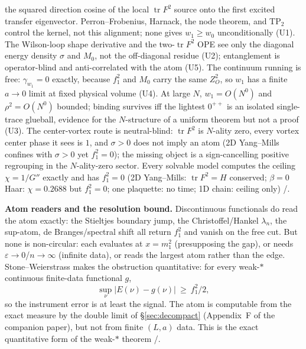 \documentclass[11pt,a4paper]{article}
\newcommand{\labb}[2]{\fcolorbox{#1!35}{#1!8}{\textcolor{#1}{\textbf{\scriptsize #2}}}}
\newcommand{\LT}{\labb{cT}{T}}
\newcommand{\LN}{\labb{cN}{N}}
\newcommand{\LE}{\labb{cE}{E}}
\begin{document}
the squared direction cosine of the local $\operatorname{tr}F^2$ source onto the first excited
transfer eigenvector. Perron--Frobenius, Harnack, the node theorem, and TP$_2$ control the kernel,
not this alignment; none gives $w_1\ge w_0$ unconditionally (U1). The Wilson-loop shape derivative
and the two-$\operatorname{tr}F^2$ OPE see only the diagonal energy density $\sigma$ and $M_0$, not
the off-diagonal residue (U2); entanglement is operator-blind and anti-correlated with the atom
(U5). The continuum running is free: $\gamma_{w_1}=0$ exactly, because $f_1^2$ and $M_0$ carry the
same $Z_O^2$, so $w_1$ has a finite $a\to0$ limit at fixed physical volume (U4). At large $N$,
$w_1=O(N^0)$ and $\rho^2=O(N^0)$ bounded; binding survives iff the lightest $0^{++}$ is an isolated
single-trace glueball, evidence for the $N$-structure of a uniform theorem but not a proof (U3). The
center-vortex route is neutral-blind:
$\operatorname{tr}F^2$ is $N$-ality zero, every vortex center phase it sees is $1$, and $\sigma>0$
does not imply an atom (2D Yang--Mills confines with $\sigma>0$ yet $f_1^2=0$); the missing object is a
sign-cancelling positive regrouping in the $N$-ality-zero sector. Every solvable model computes the
ceiling $\chi=1/G''$ exactly and has $f_1^2=0$ (2D Yang--Mills: $\operatorname{tr}F^2=H$ conserved;
$\beta=0$ Haar: $\chi=0.2688$ but $f_1^2=0$; one plaquette: no time; 1D chain: ceiling only)
\LT/\LE.

\textbf{Atom readers and the resolution bound.} Discontinuous functionals do read the atom exactly:
the Stieltjes boundary jump, the Christoffel/Hankel $\lambda_n$, the sup-atom, de Branges/spectral
shift all return $f_1^2$ and vanish on the free cut. But none is non-circular: each evaluates at
$x=m_1^2$ (presupposing the gap), or needs $\varepsilon\to0$/$n\to\infty$ (infinite data), or reads
the largest atom rather than the edge. Stone--Weierstrass makes the obstruction quantitative: for
every weak-$*$ continuous finite-data functional $g$,
\begin{equation}
  \sup_\nu|E(\nu)-g(\nu)|\ \ge\ f_1^2/2 ,
  \label{eq:resolutionbound}
\end{equation}
so the instrument error is at least the signal. The atom is computable from the exact measure by the
double limit of \S\ref{sec:decompact} (Appendix~F of the companion paper), but not from finite
$(L,a)$ data. This is the exact quantitative form of the weak-$*$ theorem \LT/\LN.
\end{document}
